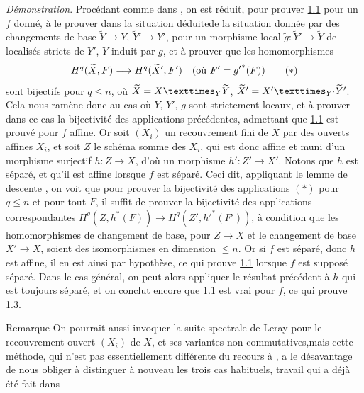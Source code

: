 \documentclass[10pt]{../fichiers-configuration-latex/smfart}
\begin{document}
\noindent
\emph{Démonstration}. Procédant comme dans , on est réduit,
pour prouver \hyperref[XVI.thm1.1]{1.1} pour un $f$ donné, à le prouver dans la situation
déduite\pageoriginale de la situation donnée par des changements de
base $\widetilde{Y}\rightarrow Y$, $\widetilde{Y}'\rightarrow Y'$,
pour un morphisme local $\widetilde{g}:\widetilde{Y}'\rightarrow
\widetilde{Y}$ de localisés stricts de $Y'$, $Y$ induit par $g$, et à
prouver que les homomorphismes
\begin{equation*}
H^{q}(\widetilde{X},F)\longrightarrow H^{q}(\widetilde{X}',F')\quad
(\mbox{\rm où } F'={g'}^{\ast}(F))\tag{$\ast$}
\end{equation*}
sont bijectifs pour $q\leq n$, où $\widetilde{X}=\fprod{X}{\widetilde{Y}}{Y}$,
$\widetilde{X}'=\fprod{X'}{\widetilde{Y}'}{Y'}$. Cela nous ramène donc au cas où
$Y$, $Y'$, $g$ sont strictement locaux, et à prouver dans ce cas la
bijectivité des applications précédentes, admettant que
\hyperref[XVI.thm1.1]{1.1} est prouvé 
pour $f$ affine. Or soit $(X_i)$ un recouvrement fini de $X$ par des
ouverts affines $X_i$, et soit $Z$ le schéma somme des $X_i$, qui est
donc affine et muni d'un morphisme surjectif $h:Z\rightarrow X$, d'où
un morphisme $h':Z'\rightarrow X'$. Notons que $h$ est séparé, et
qu'il est affine lorsque $f$ est séparé. Ceci dit, appliquant le lemme
de descente , on voit que pour prouver la bijectivité des
applications $(\ast)$ pour $q\leq n$ et pour tout $F$, il suffit de
prouver la bijectivité des applications correspondantes
$H^{q}(Z,h^{\ast}(F))\rightarrow H^{q}(Z',{h'}^{\ast}(F'))$, à
condition que les homomorphismes de changement de base, pour
$Z\rightarrow X$ et le changement de base $X'\rightarrow X$, soient
des isomorphismes en dimension $\leq n$. Or si $f$ est séparé, donc
$h$ est affine, il en est ainsi par hypothèse, ce qui prouve \hyperref[XVI.thm1.1]{1.1}
lorsque $f$ est supposé séparé. Dans le cas général, on peut alors
appliquer le résultat précédent à $h$ qui est toujours séparé, et on
conclut encore que \hyperref[XVI.thm1.1]{1.1} est vrai pour $f$, ce qui prouve \hyperref[XVI.lem1.3]{1.3}.

\begin{enonce*}[remark]{Remarque}
On pourrait aussi invoquer la suite spectrale de Leray pour le
recouvrement ouvert $(X_i)$ de $X$, et ses variantes non
commutatives,\pageoriginale mais cette méthode, qui n'est pas
essentiellement différente du recours à , a le désavantage de
nous obliger à distinguer à nouveau les trois cas habituels, travail
qui a déjà été fait dans \loccit
\end{enonce*}
\end{document}
